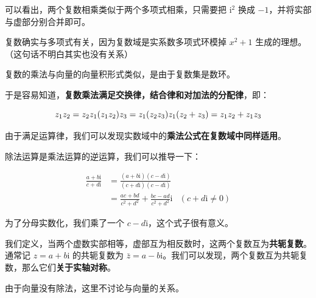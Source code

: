 可以看出，两个复数相乘类似于两个多项式相乘，只需要把 $\text{i}^2$ 换成 $-1$，并将实部与虚部分别合并即可。

复数确实与多项式有关，因为复数域是实系数多项式环模掉 $x^2+1$ 生成的理想。（这句话不明白其实也没有关系）

复数的乘法与向量的向量积形式类似，是由于复数集是数环。

于是容易知道，\textbf{复数乘法满足交换律，结合律和对加法的分配律}，即：

$$
z_1z_2=z_2z_1\\
(z_1z_2)z_3=z_1(z_2z_3)\\
z_1(z_2+z_3)=z_1z_2+z_1z_3
$$

由于满足运算律，我们可以发现实数域中的\textbf{乘法公式在复数域中同样适用}。

除法运算是乘法运算的逆运算，我们可以推导一下：

$$
\begin{aligned}
\frac{a+b\text{i}}{c+d\text{i}}&=\frac{(a+b\text{i})(c-d\text{i})}{(c+d\text{i})(c-d\text{i})}\\
&=\frac{ac+bd}{c^2+d^2}+\frac{bc-ad}{c^2+d^2}\text{i} &(c+d\text{i}\not =0)
\end{aligned}
$$

为了分母实数化，我们乘了一个 $c-d\text{i}$，这个式子很有意义。

我们定义，当两个虚数实部相等，虚部互为相反数时，这两个复数互为\textbf{共轭复数}。通常记 $z=a+b\text{i}$ 的共轭复数为 $\bar z=a-b\text{i}$。我们可以发现，两个复数互为共轭复数，那么它们\textbf{关于实轴对称}。

由于向量没有除法，这里不讨论与向量的关系。
